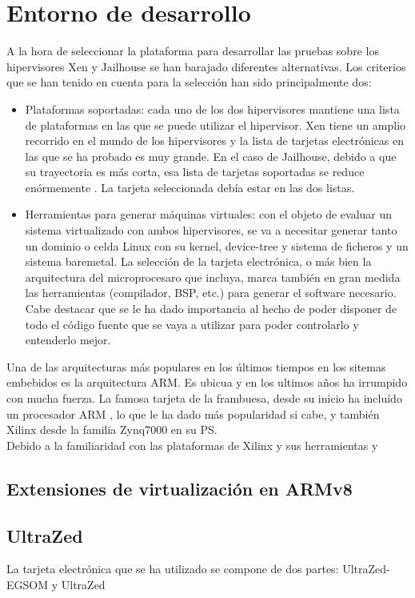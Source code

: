 \chapter{Entorno de desarrollo}

A la hora de seleccionar la plataforma para desarrollar las pruebas sobre los hipervisores Xen y Jailhouse se han barajado diferentes alternativas. Los criterios que se han tenido en cuenta para la selección han sido principalmente dos:
\begin{itemize}
  \item Plataformas soportadas: cada uno de los dos hipervisores mantiene una lista de plataformas en las que se puede utilizar el hipervisor. Xen tiene un amplio recorrido en el mundo de los hipervisores y la lista de tarjetas electrónicas en las que se ha probado es muy grande. En el caso de Jailhouse, debido a que su trayectoria es más corta, esa lista de tarjetas soportadas se reduce enórmemente \cite{jailhouse_github}. La tarjeta seleccionada debía estar en las dos listas.
  \item Herramientas para generar máquinas virtuales: con el objeto de evaluar un sistema virtualizado con ambos hipervisores, se va a necesitar generar tanto un dominio o celda Linux con su kernel, device-tree y sistema de ficheros y un sistema baremetal. La selección de la tarjeta electrónica, o más bien la arquitectura del microprocesaro que incluya, marca también en gran medida las herramientas (compilador, BSP, etc.) para generar el software necesario. Cabe destacar que se le ha dado importancia al hecho de poder disponer de todo el código fuente que se vaya a utilizar para poder controlarlo y entenderlo mejor.
\end{itemize}

Una de las arquitecturas más populares en los últimos tiempos en los sitemas embebidos es la arquitectura ARM. Es ubicua y en los ultimos años ha irrumpido con mucha fuerza. La famosa tarjeta de la frambuesa, desde su inicio ha incluído un procesador ARM , lo que le ha dado más popularidad si cabe, y también Xilinx desde la familia Zynq7000 en su PS.\\
Debido a la familiaridad con las plataformas de Xilinx y sus herramientas y

\section{Extensiones de virtualización en ARMv8}

\section{UltraZed\texttrademark}
La tarjeta electrónica que se ha utilizado se compone de dos partes: UltraZed-EG\texttrademark SOM y UltraZed\texttrademark

